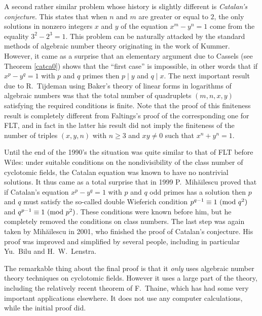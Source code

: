 \documentclass[12pt,a4paper]{article}
\renewcommand{\pmod}[1]{\allowbreak\ ({\rm{mod}}\,\,#1)}
\begin{document}
\medskip

A second rather similar problem whose history is slightly different is
\emph{Catalan's conjecture}. This states that when $n$ and $m$ are greater or
equal to $2$, the only solutions in nonzero integers $x$ and $y$ of the
equation $x^m-y^n=1$ come from the equality $3^2-2^3=1$. This problem can
be naturally attacked by the standard methods of algebraic number theory
originating in the work of Kummer. However, it came as a surprise that
an elementary argument due to Cassels (see Theorem \ref{catca0}) shows 
that the ``first case'' is impossible, in other words that if $x^p-y^q=1$ with 
$p$ and $q$ primes then $p\mid y$ and $q\mid x$.
The next important result due to R.~Tijdeman using Baker's theory of linear 
forms in logarithms of algebraic numbers was that the total
number of quadruplets $(m,n,x,y)$ satisfying the required conditions is
finite. Note that the proof of this finiteness result is completely different 
from Faltings's proof of the corresponding one for FLT, and in fact in the
latter his result did not imply the finiteness of the number of triples
$(x,y,n)$ with $n\ge3$ and $xy\ne0$ such that $x^n+y^n=1$.

Until the end of the 1990's the situation was quite similar to that of
FLT before Wiles: under suitable conditions on the nondivisibility of
the class number of cyclotomic fields, the Catalan equation was known to have 
no nontrivial solutions. It thus came as a total surprise that in 1999
P.~Mih\u{a}ilescu proved that if Catalan's equation $x^p-y^q=1$ with $p$ and 
$q$ odd primes has a solution then $p$ and $q$ must satisfy the
so-called double Wieferich condition $p^{q-1}\equiv1\pmod{q^2}$ and
$q^{p-1}\equiv1\pmod{p^2}$. These conditions were known before him, but he
completely removed the conditions on class numbers. The last step was again
taken by Mih\u{a}ilescu in 2001, who finished the proof of Catalan's 
conjecture. His proof was improved and simplified by several people, including 
in particular Yu.~Bilu and H.~W.~Lenstra.

The remarkable thing about the final proof is that it \emph{only} uses
algebraic number theory techniques on cyclotomic fields. However it uses
a large part of the theory, including the relatively recent theorem of
F.~Thaine, which has had some very important applications elsewhere.
It does not use any computer calculations, while the initial proof did. 

\medskip
\end{document}
